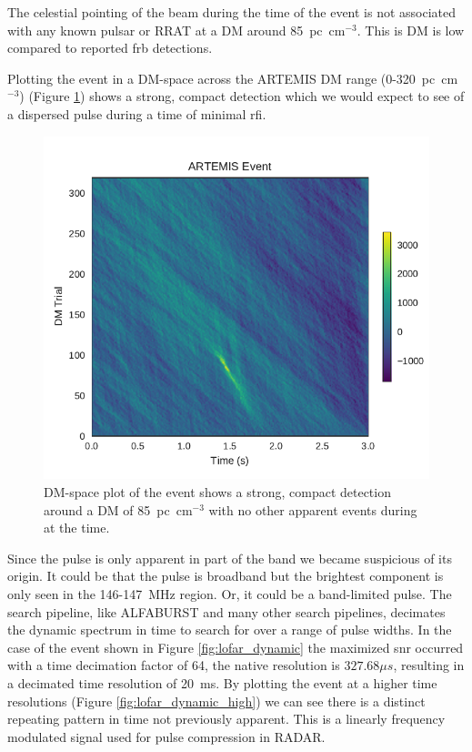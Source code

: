 \documentclass[a4paper,fleqn,usenatbib]{mnras}
\begin{document}
The celestial pointing of the beam during the time of the event is not
associated with any known pulsar or RRAT at a DM around 85~pc~cm$^{-3}$. This is
DM is low compared to reported \gls{frb} detections.

Plotting the event in a DM-space across the ARTEMIS DM range
(0-320~pc~cm$^{-3}$) (Figure \ref{fig:lofar_dm_time}) shows a strong, compact
detection which we would expect to see of a dispersed pulse during a time of
minimal \gls{rfi}.

\begin{figure}
    \includegraphics[width=1.0\linewidth]{figures/LOFAR_dm_time.pdf}
    \caption{DM-space plot of the event shows a strong, compact detection around
    a DM of 85~pc~cm$^{-3}$ with no other apparent events during at the time.
    }
    \label{fig:lofar_dm_time}
\end{figure}

Since the pulse is only apparent in part of the band we became suspicious of its
origin. It could be that the pulse is broadband but the brightest component is
only seen in the 146-147~MHz region. Or, it could be a band-limited pulse.  The
search pipeline, like ALFABURST and many other search pipelines, decimates the
dynamic spectrum in time to search for over a range of pulse widths. In the case
of the event shown in Figure \ref{fig:lofar_dynamic} the maximized \gls{snr}
occurred with a time decimation factor of 64, the native resolution is $327.68
\mu s$, resulting in a decimated time resolution of 20~ms. By plotting the event
at a higher time resolutions (Figure \ref{fig:lofar_dynamic_high}) we can see
there is a distinct repeating pattern in time not previously apparent. This is a
linearly frequency modulated signal used for pulse compression in RADAR.
\end{document}
